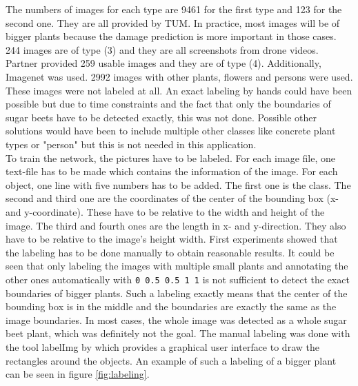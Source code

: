 The numbers of images for each type are 9461 for the first type and 123 for the second one. They are all provided by TUM. In practice, most images will be of bigger plants because the damage prediction is more important in those cases. 244 images are of type (3) and they are all screenshots from drone videos. Partner provided 259 usable images and they are of type (4). Additionally, Imagenet was used. 2992 images with other plants, flowers and persons were used. These images were not labeled at all. An exact labeling by hands could have been possible but due to time constraints and the fact that only the boundaries of sugar beets have to be detected exactly, this was not done. Possible other solutions would have been to include multiple other classes like concrete plant types or "person" but this is not needed in this application.\\

To train the network, the pictures have to be labeled. For each image file, one text-file has to be made which contains the information of the image. For each object, one line with five numbers has to be added. The first one is the class. The second and third one are the coordinates of the center of the bounding box (x- and y-coordinate). These have to be relative to the width and height of the image. The third and fourth ones are the length in x- and y-direction. They also have to be relative to the image's height width. First experiments showed that the labeling has to be done manually to obtain reasonable results. It could be seen that only labeling the images with multiple small plants and annotating the other ones automatically with \texttt{0 0.5 0.5 1 1} is not sufficient to detect the exact boundaries of bigger plants. Such a labeling exactly means that the center of the bounding box is in the middle and the boundaries are exactly the same as the image boundaries. In most cases, the whole image was detected as a whole sugar beet plant, which was definitely not the goal. The manual labeling was done with the tool labelImg by \cite{labelimg} which provides a graphical user interface to draw the rectangles around the objects. An example of such a labeling of a bigger plant can be seen in figure \ref{fig:labeling}.

